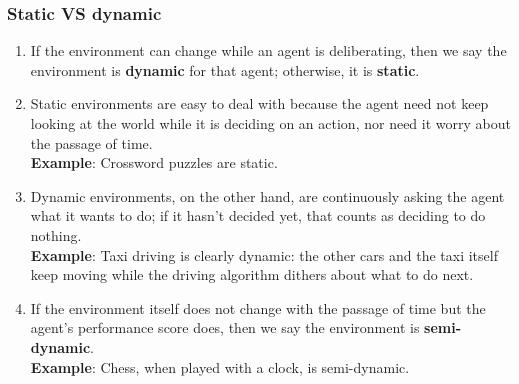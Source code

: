 \subsubsection{Static VS dynamic}
\begin{enumerate}
    \item If the environment can change while an agent is deliberating, then we say the environment is \textbf{dynamic} for that agent; otherwise, it is \textbf{static}.

    \item Static environments are easy to deal with because the agent need not keep looking at the world while it is deciding on an action, nor need it worry about the passage of time.\\
    \textbf{Example}: Crossword puzzles are static.

    \item Dynamic environments, on the other hand, are continuously asking the agent what it wants to do; if it hasn’t decided yet, that counts as deciding to do nothing. \\
    \textbf{Example}: Taxi driving is clearly dynamic: the other cars and the taxi itself keep moving while the driving algorithm dithers about what to do next.

    \item If the environment itself does not change with the passage of time but the agent’s performance score does, then we say the environment is \textbf{semi-dynamic}. \\
    \textbf{Example}: Chess, when played with a clock, is semi-dynamic.
\end{enumerate}


